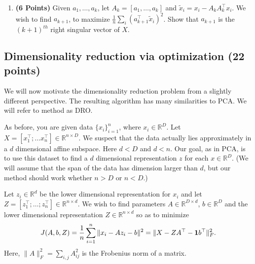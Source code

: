 \documentclass[a4paper]{article}
\newcounter{thm}
\newcommand*{\one}{{\bf 1}}
\theoremstyle{definition}
\newcommand{\RR}{\mathbb{R}}
\begin{document}
\begin{enumerate}





 

\item  \textbf{(6 Points)}
Given $a_1, \dots, a_k$, let $A_k = [a_1, \dots, a_k]$ and 
$\tilde{x}_i = x_i - A_kA_k^\top x_i$. We wish to find $a_{k+1}$, to maximize
$\frac{1}{n} \sum_i (a_{k+1}^\top \tilde{x}_i)^2$. Show that $a_{k+1}$ is the
$(k+1)^{th}$ right singular vector of $X$.


\end{enumerate}




\subsection{Dimensionality reduction via optimization (22 points)}

We will now motivate the dimensionality reduction problem from a slightly different
perspective. The resulting algorithm has many similarities to PCA.
We will refer to method as DRO.

As before, you are given data $\{x_i\}_{i=1}^n$, where $x_i \in \RR^D$. Let $X=[x_1^\top; \dots
x_n^\top] \in \RR^{n\times D}$. We suspect that the data
actually lies approximately in  a $d$ dimensional affine subspace.
Here $d<D$ and $d<n$.
Our goal, as in PCA, is to use this dataset to find a $d$ dimensional representation $z$ for each $x\in\RR^D$.
(We will assume that the span of the data has dimension larger than
$d$, but our method should work whether $n>D$ or $n<D$.)


Let $z_i\in \RR^d$ be the lower dimensional representation for $x_i$ and
let $Z = [z_1^\top; \dots; z_n^\top] \in \RR^{n\times d}$.
We wish to find parameters $A \in \RR^{D\times d}$, $b\in\RR^D$ and the lower
dimensional representation $Z\in \RR^{n\times d}$ so as to minimize 
\begin{equation}
J(A,b,Z) = \frac{1}{n} \sum_{i=1}^n \|x_i - Az_i - b\|^2 = \| X - ZA^\top - \one b^\top\|_F^2.
\label{eqn:dimobj}
\end{equation}
Here, $\|A\|^2_F = \sum_{i,j} A_{ij}^2$ is the Frobenius norm of a matrix.
\end{document}
